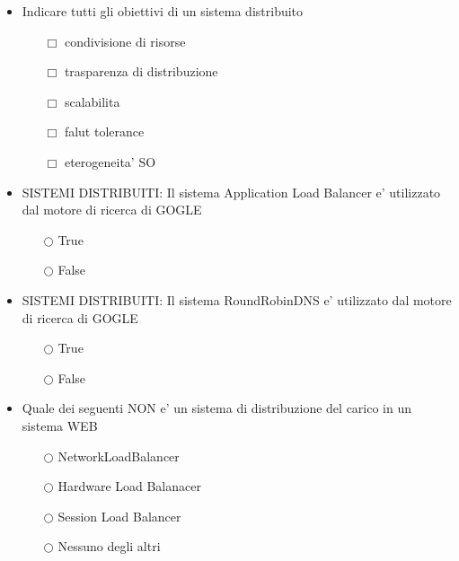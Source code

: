 \documentclass[10pt,twocolumn]{article}
\begin{document}
\begin{itemize}
    \item Indicare tutti gli obiettivi di un sistema distribuito
          \begin{itemize}
              \item[$\Box$] condivisione di risorse
              \item[$\Box$] trasparenza di distribuzione
              \item[$\Box$] scalabilita
              \item[$\Box$]  falut tolerance
              \item[$\Box$] eterogeneita' SO
          \end{itemize}
\end{itemize}
\begin{itemize}
    \item SISTEMI DISTRIBUITI: Il sistema Application Load Balancer e' utilizzato dal motore di ricerca di GOGLE
          \begin{itemize}
              \item[$\bigcirc$] True
              \item[$\bigcirc$] False
          \end{itemize}
\end{itemize}
\begin{itemize}
    \item SISTEMI DISTRIBUITI: Il sistema RoundRobinDNS e' utilizzato dal motore di ricerca di GOGLE
          \begin{itemize}
              \item[$\bigcirc$] True
              \item[$\bigcirc$] False
          \end{itemize}
\end{itemize}
\begin{itemize}
    \item Quale dei seguenti NON e' un sistema di distribuzione del carico in un sistema WEB
          \begin{itemize}
              \item[$\bigcirc$] NetworkLoadBalancer
              \item[$\bigcirc$] Hardware Load Balanacer
              \item[$\bigcirc$] Session Load Balancer
              \item[$\bigcirc$] Nessuno degli altri
          \end{itemize}
\end{itemize}
\end{document}
